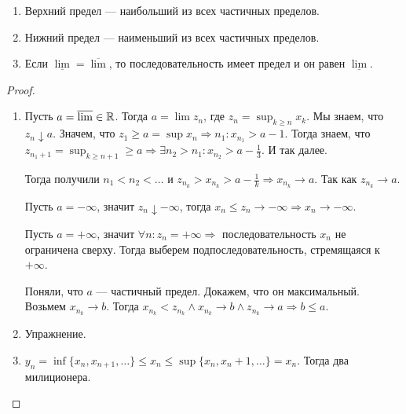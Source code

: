\begin{theorem}
    \slashn
    \begin{enumerate}
        \item Верхний предел --- наибольший из всех частичных пределов.
        \item Нижний предел --- наименьший из всех частичных пределов.
        \item Если $\underline{\lim} = \overline{\lim}$, то последовательность имеет предел и он равен  $\underline{\lim}$.
    \end{enumerate}
\end{theorem}
\begin{proof}
    \slashn
    \begin{enumerate}
        \item Пусть $a = \overline{\lim} \in \mathbb{R}$. Тогда  $a = \lim z_n$, где  $z_n = \sup_{k \ge n} x_k$. Мы знаем, что $z_n \downarrow a$. Значем, что $z_1 \ge a = \sup x_n \Rightarrow n_1: x_{n_1} > a - 1$. Тогда знаем, что $z_{n_1+1} = \sup_{k \ge n + 1} \ge a \Rightarrow \exists n_2 > n_1: x_{n_2} > a-\frac{1}{3}$. И так далее.

            Тогда получили $n_1 < n_2 < \ldots$ и $z_{n_k} > x_{n_k} > a-\frac{1}{k} \Rightarrow x_{n_k} \to a$. Так как $z_{n_k} \to a$.

            Пусть $a = -\infty$, значит  $z_n \downarrow -\infty$, тогда  $x_n \le z_n \to -\infty \Rightarrow x_n \to -\infty$.

            Пусть $a = +\infty$, значит  $\forall n: z_n = +\infty \Rightarrow$ последовательность  $x_n$ не ограничена сверху. Тогда выберем подпоследовательность, стремящаяся к $+\infty$.

            Поняли, что  $a$ --- частичный предел. Докажем, что он максимальный. Возьмем $x_{n_k} \to b$. Тогда  $x_{n_k} < z_{n_k} \land x_{n_k} \to b \land z_{n_k} \to a \Rightarrow b \le a$. 
        \item Упражнение.
        \item $y_n = \inf \{x_n, x_{n+1},\ldots\} \le x_n \le \sup \{x_n, x_n+1,\ldots\} = x_n$. Тогда два милиционера.
    \end{enumerate}
\end{proof}
